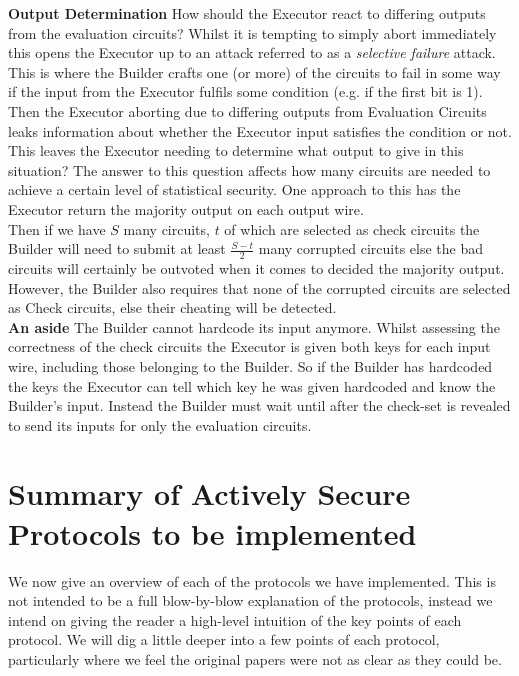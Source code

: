 \documentclass[ %
                    author={Nicholas Tutte},
                supervisor={Prof. Nigel Smart},
                    degree={MEng},
                     title={Secure Two Party Computation},
                  subtitle={A practical comparison of recent protocols},
                      type={Research - GG1K},
                      year={2015} ]{dissertation}
\begin{document}
				\noindent \textbf{Output Determination} How should the Executor react to differing outputs from the evaluation circuits? Whilst it is tempting to simply abort immediately this opens the Executor up to an attack referred to as a \emph{selective failure} attack. This is where the Builder crafts one (or more) of the circuits to fail in some way if the input from the Executor fulfils some condition (e.g. if the first bit is 1). Then the Executor aborting due to differing outputs from Evaluation Circuits leaks information about whether the Executor input satisfies the condition or not.\\

				This leaves the Executor needing to determine what output to give in this situation? The answer to this question affects how many circuits are needed to achieve a certain level of statistical security. One approach to this has the Executor return the majority output on each output wire.\\
				
				Then if we have $S$ many circuits, $t$ of which are selected as check circuits the Builder will need to submit at least $\frac{S - t}{2}$ many corrupted circuits else the bad circuits will certainly be outvoted when it comes to decided the majority output. However, the Builder also requires that none of the corrupted circuits are selected as Check circuits, else their cheating will be detected.\\

				\noindent \textbf{An aside} The Builder cannot hardcode its input anymore. Whilst assessing the correctness of the check circuits the Executor is given both keys for each input wire, including those belonging to the Builder. So if the Builder has hardcoded the keys the Executor can tell which key he was given hardcoded and know the Builder's input. Instead the Builder must wait until after the check-set is revealed to send its inputs for only the evaluation circuits.

	\chapter{Summary of Actively Secure Protocols to be implemented} \label{sec:Protocols}
		We now give an overview of each of the protocols we have implemented. This is not intended to be a full blow-by-blow explanation of the protocols, instead we intend on giving the reader a high-level intuition of the key points of each protocol. We will dig a little deeper into a few points of each protocol, particularly where we feel the original papers were not as clear as they could be.
\end{document}
